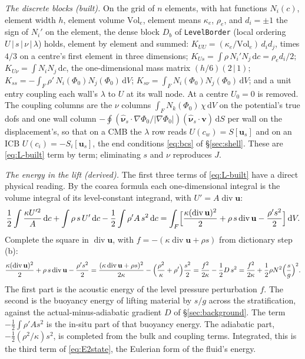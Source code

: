 \documentclass[11pt]{article}
\theoremstyle{definition}
\theoremstyle{remark}
\newcommand{\bu}{\mathbf{u}}
\newcommand{\bv}{\mathbf{v}}
\newcommand{\dS}{\,\mathrm{d}S}
\newcommand{\dV}{\,\mathrm{d}V}
\newcommand{\dc}{\,\mathrm{d}c}
\newcommand{\Div}{\operatorname{div}}
\newcommand{\code}[1]{\texttt{#1}}
\newcommand{\nuhs}{\hat{\boldsymbol{\nu}}_s}
\begin{document}
\emph{The discrete blocks (built).} On the grid of $n$ elements, with
hat functions $N_i(c)$, element width $h$, element volume
$\mathrm{Vol}_e$, element means $\kappa_e$, $\rho_e$, and $d_i = \pm1$
the sign of $N_i'$ on the element, the dense block $D_b$ of
\code{LevelBorder} (local ordering $U\,|\,s\,|\,\nu\,|\,\lambda$)
holds, element by element and summed:
$K_{UU} = (\kappa_e/\mathrm{Vol}_e)\,d_id_j$, times $4/3$ on a centre's
first element in three dimensions; $K_{Us} = \int\rho\,N_i'N_j\dc =
\rho_ed_i/2$; $K_{U\nu} = \int N_iN_j\dc$, the one-dimensional mass
matrix $(h/6)(2\,|\,1)$; $K_{ss} = -\int_F\rho'\,N_i(\Phi_0)N_j(\Phi_0)
\dV$; $K_{s\nu} = \int_F N_i(\Phi_0)N_j(\Phi_0)\dV$; and a unit entry
coupling each wall's $\lambda$ to $U$ at its wall node. At a centre
$U_0 = 0$ is removed. The coupling columns are the $\nu$ columns
$\int_FN_k(\Phi_0)\,\chi\dV$ on the potential's true dofs and one wall
column $-\oint(\nuhs\cdot\nabla\Phi_0/|\nabla\Phi_0|)(\nuhs\cdot\bv)\dS$
per wall on the displacement's, so that on a CMB the $\lambda$ row reads
$U(c_w) = S[\bu_s]$ and on an ICB $U(c_i) = -S_i[\bu_s]$, the end
conditions \eqref{eq:bcs} of \S\ref{sec:shell}. These are
\eqref{eq:L-built} term by term; eliminating $s$ and $\nu$ reproduces
$J$.

\emph{The energy in the lift (derived).} The first three terms of
\eqref{eq:L-built} have a direct physical reading. By the coarea
formula each one-dimensional integral is the volume integral of its
level-constant integrand, with $U' = A\Div\bu$:
\begin{equation*}
  \frac12\int\frac{\kappa U'^2}{A}\dc + \int\rho\,s\,U'\dc
  - \frac12\int\rho' A\,s^2\dc
  = \int_F\Bigl[\frac{\kappa(\Div\bu)^2}{2} + \rho\,s\Div\bu
     - \frac{\rho' s^2}{2}\Bigr]\dV .
\end{equation*}
Complete the square in $\Div\bu$, with $f = -(\kappa\Div\bu + \rho s)$
from dictionary step (b):
\begin{equation*}
  \frac{\kappa(\Div\bu)^2}{2} + \rho\,s\Div\bu - \frac{\rho' s^2}{2}
  = \frac{(\kappa\Div\bu + \rho s)^2}{2\kappa}
    - \Bigl(\frac{\rho^2}{\kappa} + \rho'\Bigr)\frac{s^2}{2}
  = \frac{f^2}{2\kappa} - \frac12 D\,s^2
  = \frac{f^2}{2\kappa}
     + \frac12\rho N^2\Bigl(\frac{s}{g}\Bigr)^2 .
\end{equation*}
The first part is the acoustic energy of the level pressure
perturbation $f$. The second is the buoyancy energy of lifting
material by $s/g$ across the stratification, against the
actual-minus-adiabatic gradient $D$ of \S\ref{sec:background}. The term
$-\tfrac12\int\rho' As^2$ is the in-situ part of that buoyancy
energy. The adiabatic part, $-\tfrac12(\rho^2/\kappa)s^2$, is completed
from the bulk and coupling terms. Integrated, this is the third term of
\eqref{eq:E2state}, the Eulerian form of the fluid's energy.
\end{document}
